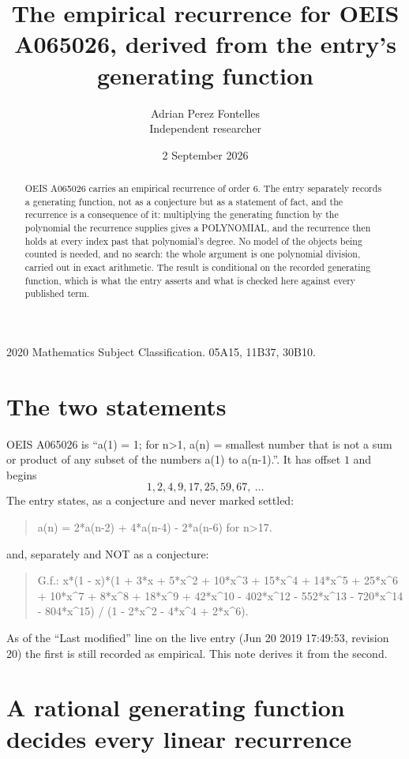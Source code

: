 \documentclass[11pt,a4paper]{article}
\title{The empirical recurrence for OEIS A065026, derived from the entry's generating function}
\author{Adrian Perez Fontelles\\ \small Independent researcher}
\date{2 September 2026}
\theoremstyle{plain}
\theoremstyle{definition}
\begin{document}
\maketitle

\begin{abstract}
OEIS A065026 carries an empirical recurrence of order $6$. The entry separately records a
generating function, not as a conjecture but as a statement of fact, and the recurrence is a
consequence of it: multiplying the generating function by the polynomial the recurrence
supplies gives a POLYNOMIAL, and the recurrence then holds at every index past that
polynomial's degree. No model of the objects being counted is needed, and no search: the
whole argument is one polynomial division, carried out in exact arithmetic. The result is
conditional on the recorded generating function, which is what the entry asserts and what is
checked here against every published term.
\end{abstract}

\noindent\small 2020 Mathematics Subject Classification. 05A15, 11B37, 30B10.\normalsize

\section{The two statements}

OEIS A065026 is ``a(1) = 1; for n>1, a(n) = smallest number that is not a sum or product of any subset of the numbers a(1) to a(n-1).''. It has offset $1$ and begins
\[
1, 2, 4, 9, 17, 25, 59, 67,\ \dots
\]
The entry states, as a conjecture and never marked settled:
\begin{quote}
a(n) = 2*a(n-2) + 4*a(n-4) - 2*a(n-6) for n>17.
\end{quote}
and, separately and NOT as a conjecture:
\begin{quote}
G.f.: x*(1 - x)*(1 + 3*x + 5*x\^{}2 + 10*x\^{}3 + 15*x\^{}4 + 14*x\^{}5 + 25*x\^{}6 + 10*x\^{}7 + 8*x\^{}8 + 18*x\^{}9 + 42*x\^{}10 - 402*x\^{}12 - 552*x\^{}13 - 720*x\^{}14 - 804*x\^{}15) / (1 - 2*x\^{}2 - 4*x\^{}4 + 2*x\^{}6).
\end{quote}
As of the ``Last modified'' line on the live entry (Jun 20 2019 17:49:53, revision 20) the first is still
recorded as empirical. This note derives it from the second.

\section{A rational generating function decides every linear recurrence}
\end{document}
